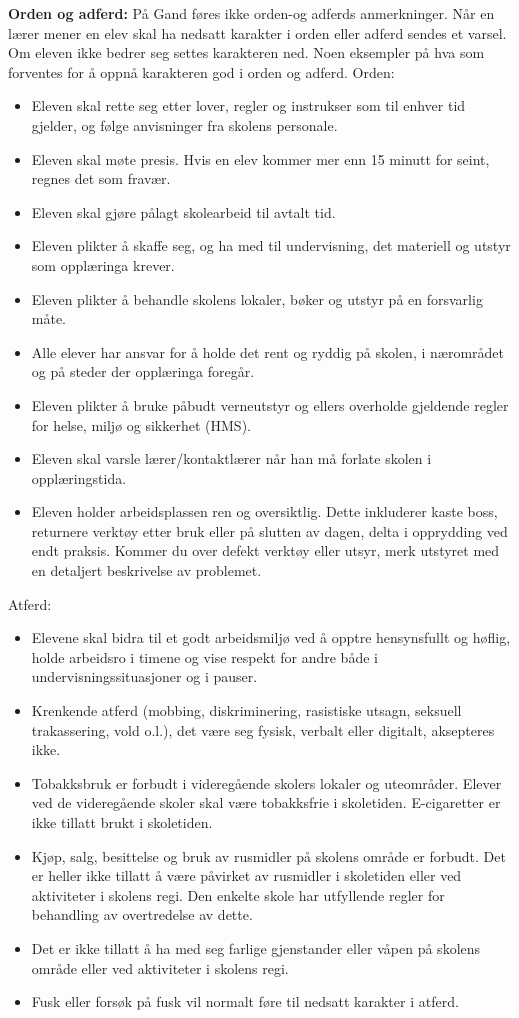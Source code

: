 \documentclass[12pt,a4paper]{book}
\begin{document}
\noindent
{\bf Orden og adferd:} På Gand føres ikke orden-og adferds anmerkninger. Når en lærer mener en elev skal ha nedsatt karakter i orden eller adferd sendes et varsel. Om eleven ikke bedrer seg settes karakteren ned. 
\vskip 10pt
Noen eksempler på hva som forventes for å oppnå karakteren god i orden og adferd. 
\vskip 10pt
Orden:
\begin{itemize}
\vskip 10pt
\item{}Eleven skal rette seg etter lover, regler og instrukser som til enhver tid gjelder, og følge anvisninger fra skolens personale.
\item{}Eleven skal møte presis. Hvis en elev kommer mer enn 15 minutt for seint, regnes det som fravær.
\item{}Eleven skal gjøre pålagt skolearbeid til avtalt tid.
\item{}Eleven plikter å skaffe seg, og ha med til undervisning, det materiell og utstyr som opplæringa krever.
\item{}Eleven plikter å behandle skolens lokaler, bøker og utstyr på en forsvarlig måte.
\item{}Alle elever har ansvar for å holde det rent og ryddig på skolen, i nærområdet og på steder der opplæringa foregår.
\item{}Eleven plikter å bruke påbudt verneutstyr og ellers overholde gjeldende regler for helse, miljø og sikkerhet (HMS).
\item{}Eleven skal varsle lærer/kontaktlærer når han må forlate skolen i opplæringstida.

\item{} Eleven holder arbeidsplassen ren og oversiktlig. Dette inkluderer kaste boss, returnere verktøy etter bruk eller på slutten av dagen, delta i opprydding ved endt praksis. Kommer du over defekt verktøy eller utsyr, merk utstyret med en detaljert beskrivelse av problemet. 
\vskip 10pt
\end{itemize}
Atferd:
\vskip 10pt
\begin{itemize}
\item{}Elevene skal bidra til et godt arbeidsmiljø ved å opptre hensynsfullt og høflig, holde arbeidsro i timene og vise respekt for andre både i undervisningssituasjoner og i pauser.
\item{}Krenkende atferd (mobbing, diskriminering, rasistiske utsagn, seksuell trakassering, vold o.l.), det være seg fysisk, verbalt eller digitalt, aksepteres ikke.
\item{}Tobakksbruk er forbudt i videregående skolers lokaler og uteområder. Elever ved de videregående skoler skal være tobakksfrie i skoletiden. E-cigaretter er ikke tillatt brukt i skoletiden.
\item{}Kjøp, salg, besittelse og bruk av rusmidler på skolens område er forbudt. Det er heller ikke tillatt å være påvirket av rusmidler i skoletiden eller ved aktiviteter i skolens regi. Den enkelte skole har utfyllende regler for behandling av overtredelse av dette.
\item{}Det er ikke tillatt å ha med seg farlige gjenstander eller våpen på skolens område eller ved aktiviteter i skolens regi.
\item{}Fusk eller forsøk på fusk vil normalt føre til nedsatt karakter i atferd.
\end{itemize}
\end{document}
